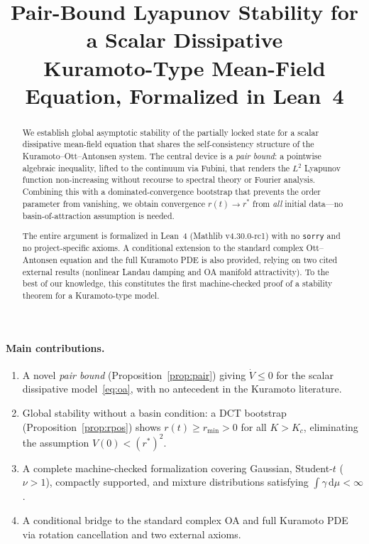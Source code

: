\documentclass[11pt,a4paper]{article}
\title{Pair-Bound Lyapunov Stability for a Scalar Dissipative\\
Kuramoto-Type Mean-Field Equation, Formalized in Lean~4}
\author{}
\date{}
\theoremstyle{definition}
\begin{document}
\maketitle

\begin{abstract}
We establish global asymptotic stability of the partially locked state for a scalar dissipative mean-field equation that shares the self-consistency structure of the Kuramoto--Ott--Antonsen system. The central device is a \emph{pair bound}: a pointwise algebraic inequality, lifted to the continuum via Fubini, that renders the $L^2$ Lyapunov function non-increasing without recourse to spectral theory or Fourier analysis. Combining this with a dominated-convergence bootstrap that prevents the order parameter from vanishing, we obtain convergence $r(t)\to r^*$ from \emph{all} initial data---no basin-of-attraction assumption is needed.

The entire argument is formalized in Lean~4 (Mathlib v4.30.0-rc1) with no \texttt{sorry} and no project-specific axioms. A conditional extension to the standard complex Ott--Antonsen equation and the full Kuramoto PDE is also provided, relying on two cited external results (nonlinear Landau damping and OA manifold attractivity). To the best of our knowledge, this constitutes the first machine-checked proof of a stability theorem for a Kuramoto-type model.
\end{abstract}

\paragraph{Main contributions.}
\begin{enumerate}[label=(\arabic*)]
\item A novel \emph{pair bound} (Proposition~\ref{prop:pair}) giving $\dot V \leq 0$ for the scalar dissipative model~\eqref{eq:oa}, with no antecedent in the Kuramoto literature.
\item Global stability without a basin condition: a DCT bootstrap (Proposition~\ref{prop:rpos}) shows $r(t) \geq r_{\min} > 0$ for all $K > K_c$, eliminating the assumption $V(0) < (r^*)^2$.
\item A complete machine-checked formalization covering Gaussian, Student-$t$ ($\nu>1$), compactly supported, and mixture distributions satisfying $\int\gamma\,\mathrm{d}\mu<\infty$.
\item A conditional bridge to the standard complex OA and full Kuramoto PDE via rotation cancellation and two external axioms.
\end{enumerate}
\end{document}
